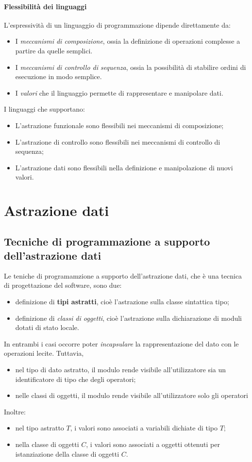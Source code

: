 \documentclass[12pt]{report}
\begin{document}
			\paragraph{Flessibilità dei linguaggi} L'espressività di un linguaggio di programmazione dipende direttamente da:
			\begin{itemize}
				\item I \textit{meccanismi di composizione}, ossia la definizione di operazioni complesse a partire da quelle semplici.
				\item I \textit{meccanismi di controllo di sequenza}, ossia la possibilità di stabilire ordini di esecuzione in modo semplice.
				\item I \textit{valori} che il linguaggio permette di rappresentare e manipolare dati.
			\end{itemize}
			I linguaggi che supportano:
			\begin{itemize}
				\item L'astrazione funzionale sono flessibili nei meccanismi di composizione;
				\item L'astrazione di controllo sono flessibili nei meccanismi di controllo di sequenza;
				\item L'astrazione dati sono flessibili nella definizione e manipolazione di nuovi valori.
			\end{itemize}
			\section{Astrazione dati}
			\subsection{Tecniche di programmazione a supporto dell'astrazione dati}
			Le teniche di programamzione a supporto dell'astrazione dati, che è una tecnica di progettazione del software, sono due:
			\begin{itemize}
				\item definizione di \textbf{tipi astratti}, cioè l'astrazione sulla classe sintattica tipo;
				\item definizione di \textit{classi di oggetti}, cioè l'astrazione sulla dichiarazione di moduli dotati di stato locale.
			\end{itemize}
			In entrambi i casi occorre poter \textit{incapsulare} la rappresentazione del dato con le operazioni lecite. Tuttavia,
			\begin{itemize}
				\item nel tipo di dato astratto, il modulo rende visibile all'utilizzatore sia un identificatore di tipo che degli operatori;
				\item nelle classi di oggetti, il modulo rende visibile all'utilizzatore solo gli operatori
			\end{itemize}
			Inoltre:
			\begin{itemize}
				\item nel tipo astratto $T$, i valori sono associati a variabili dichiate di tipo $T$;
				\item nella classe di oggetti $C$, i valori sono associati a oggetti ottenuti per istanziazione della classe di oggetti  $C$.
			\end{itemize}
\end{document}
